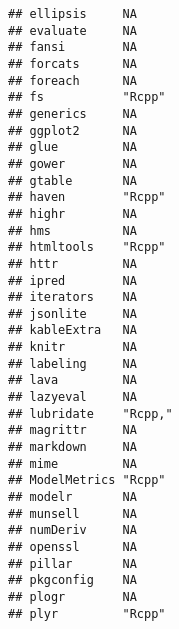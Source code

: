 \documentclass[]{article}
\begin{document}
\begin{verbatim}
## ellipsis     NA                                                    
## evaluate     NA                                                    
## fansi        NA                                                    
## forcats      NA                                                    
## foreach      NA                                                    
## fs           "Rcpp"                                                
## generics     NA                                                    
## ggplot2      NA                                                    
## glue         NA                                                    
## gower        NA                                                    
## gtable       NA                                                    
## haven        "Rcpp"                                                
## highr        NA                                                    
## hms          NA                                                    
## htmltools    "Rcpp"                                                
## httr         NA                                                    
## ipred        NA                                                    
## iterators    NA                                                    
## jsonlite     NA                                                    
## kableExtra   NA                                                    
## knitr        NA                                                    
## labeling     NA                                                    
## lava         NA                                                    
## lazyeval     NA                                                    
## lubridate    "Rcpp,"                                               
## magrittr     NA                                                    
## markdown     NA                                                    
## mime         NA                                                    
## ModelMetrics "Rcpp"                                                
## modelr       NA                                                    
## munsell      NA                                                    
## numDeriv     NA                                                    
## openssl      NA                                                    
## pillar       NA                                                    
## pkgconfig    NA                                                    
## plogr        NA                                                    
## plyr         "Rcpp"                                                

\end{verbatim}
\end{document}

